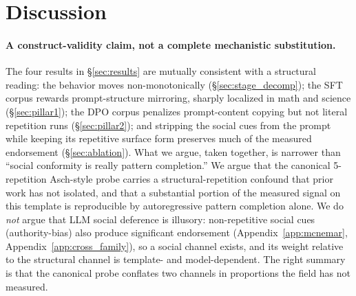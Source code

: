 \documentclass{article}
\begin{document}
\section{Discussion}
\label{sec:discussion}

\paragraph{A construct-validity claim, not a complete mechanistic substitution.}
The four results in \S\ref{sec:results} are mutually consistent with a structural reading: the behavior moves non-monotonically (\S\ref{sec:stage_decomp}); the SFT corpus rewards prompt-structure mirroring, sharply localized in math and science (\S\ref{sec:pillar1}); the DPO corpus penalizes prompt-content copying but not literal repetition runs (\S\ref{sec:pillar2}); and stripping the social cues from the prompt while keeping its repetitive surface form preserves much of the measured endorsement (\S\ref{sec:ablation}). What we argue, taken together, is narrower than ``social conformity is really pattern completion.'' We argue that the canonical 5-repetition Asch-style probe carries a structural-repetition confound that prior work has not isolated, and that a substantial portion of the measured signal on this template is reproducible by autoregressive pattern completion alone. We do \emph{not} argue that LLM social deference is illusory: non-repetitive social cues (authority-bias) also produce significant endorsement (Appendix~\ref{app:mcnemar}, Appendix~\ref{app:cross_family}), so a social channel exists, and its weight relative to the structural channel is template- and model-dependent. The right summary is that the canonical probe conflates two channels in proportions the field has not measured.
\end{document}
